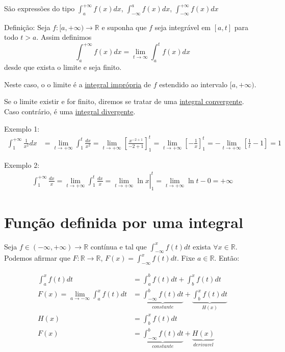 \documentclass[12pt,openany]{book}
\begin{document}
\hspace{5mm} São expressões do tipo $\displaystyle{\int_a^{+ \infty}f(x)dx}$, $\displaystyle{\int_{-\infty}^{a} f(x)dx}$, $\displaystyle{\int_{-\infty}^{+ \infty}f(x)dx}$\\
\vspace{15pt}

Definição: Seja $f:{[a,+\infty)}\rightarrow \mathds{R}$ e suponha que $f$ seja integrável em $[a,t]$ para todo $t>a$. Assim definimos $$ \int_a^{+\infty}f(x)dx = \lim_{t\rightarrow\infty}\int_a^t f(x)dx$$ desde que exista o limite e seja finito.

Neste caso, o o limite é a \underline{integral imprópria} de $f$ estendido ao intervalo $[a,+\infty)$.

Se o limite existir e for finito, diremos se tratar de uma \underline{integral convergente}. Caso contrário, é uma \underline{integral divergente}.

Exemplo 1:
\begin{align*}
\int_1^{+\infty}\frac{1}{x^2}dx &= \lim_{t\rightarrow + \infty}\int_1^t \frac{dx}{x^2}=\lim_{t\rightarrow + \infty}\left[\frac{x^{-2+1}}{-2+1}\right]_1^t = \lim_{t\rightarrow + \infty}\left[-\frac{1}{x}\right]_1^t = -\lim_{t\rightarrow + \infty}\left[\frac{1}{t}-1\right]=1
\end{align*}

Exemplo 2:
\begin{align*}
\int_1^{+\infty}\frac{dx}{x}= \lim_{t\rightarrow + \infty}\int_1^t\frac{dx}{x}= \left.\lim_{t\rightarrow + \infty}\ln x \right|_1^t = \lim_{t\rightarrow + \infty}\ln t - 0 = +\infty
\end{align*}

\section{Função definida por uma integral}
\label{sec:s12}

\hspace{5mm} Seja $f \in (-\infty, +\infty) \rightarrow \mathds{R}$ contínua e tal que $\displaystyle{\int_{-\infty}^x f(t)dt}$ exista $\displaystyle{\forall x \in \mathds{R}}$. Podemos afirmar que $F:\mathds{R}\rightarrow\mathds{R}$, $\displaystyle{F(x)=\int_{-\infty}^x f(t)dt}$. Fixe $a \in \mathds{R}$. Então:

\begin{align*}
\int_a^x f(t)dt &= \int_a^b f(t)dt + \int_b^x f(t)dt \\
F(x) = \lim_{a\rightarrow - \infty}\int_a^xf(t)dt &= \underbrace{\int_{-\infty}^b f(t)dt}_{constante} + \underbrace{\int_b^x f(t)dt}_{H(x)}\\
H(x) &= \int_b^x f(t)dt \\
F(x) &= \underbrace{\int_{-\infty}^b f(t)dt}_{constante}+ \underbrace{H(x)}_{derivavel} 
\end{align*}
\end{document}
